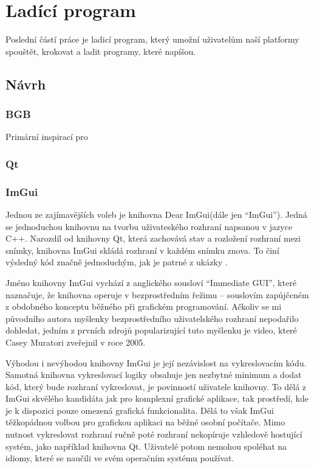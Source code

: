 \chapter{Ladící program}

Poslední částí práce je ladicí program, který umožní uživatelům naší platformy spouštět, krokovat a ladit programy, které napíšou.

\section{Návrh}

\blind[1]

\subsection{BGB}

Primární inspirací pro 


\subsection{Qt}

\blind[2]


\subsection{ImGui}

Jednou ze zajímavějších voleb je knihovna Dear ImGui\todocite (dále jen ``ImGui''). Jedná se jednoduchou knihovnu na tvorbu uživateského rozhraní napsanou v jazyce C++. Narozdíl od knihovny Qt, která zachovává stav a rozložení rozhraní mezi snímky, knihovna ImGui skládá rozhraní v každém snímku znova. To činí výsledný kód značně jednoduchým, jak je patrné z ukázky .

Jméno knihovny ImGui vychází z anglického sousloví ``Immediate GUI'', které naznačuje, že knihovna operuje v bezprostředním řežimu -- souslovím zapůjčeném z obdobného konceptu běžného při grafickém programování. Ačkoliv se mi původního autora myšlenky bezprostředního uživatelského rozhraní nepodařilo dohledat, jedním z prvních zdrojů popularizující tuto myšlenku je video, které Casey Muratori zveřejnil v roce 2005\todocite.


Výhodou i nevýhodou knihovny ImGui je její nezávislost na vykreslovacím kódu. Samotná knihovna vykreslovací logiky obsahuje jen nezbytné minimum a dodat kód, který bude rozhraní vykreslovat, je povinností uživatele knihovny. To dělá z ImGui skvělého kandidáta jak pro komplexní grafické aplikace, tak prostředí, kde je k dispozici pouze omezená grafická funkcionalita. Dělá to však ImGui těžkopádnou volbou pro grafickou aplikaci na běžné osobní počítače. Mimo nutnost vykreslovat rozhraní ručně poté rozhraní nekopíruje vzhledově hostující systém, jako například knihovna Qt. Uživatelé potom nemohou spoléhat na idiomy, které se naučili ve svém operačním systému používat.

